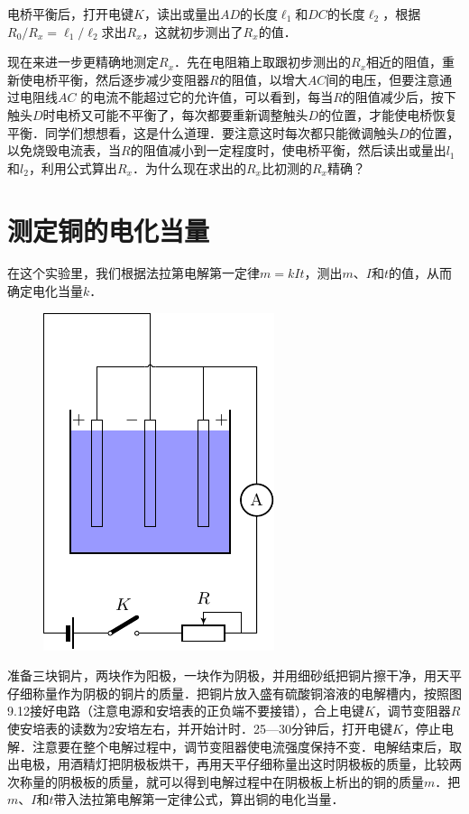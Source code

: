 电桥平衡后，打开电键$K$，读出或量出$AD$的长度$\ell_1$和$DC$的长度$\ell_2$，根据$R_0/R_x=\ell_1/\ell_2$求出$R_x$，这就初步测出了$R_x$的值．

现在来进一步更精确地测定$R_x$．先在电阻箱上取跟初步测出的$R_x$相近的阻值，重新使电桥平衡，然后逐步减少变阻器$R$的阻值，以增大$AC$间的电压，但要注意通过电阻线$AC$
的电流不能超过它的允许值，可以看到，每当$R$的阻值减少后，按下触头$D$时电桥又可能不平衡了，每次都要重新调整触头$D$的位置，才能使电桥恢复平衡．同学们想想看，这是什么道理．要注意这时每次都只能微调触头$D$的位置，以免烧毁电流表，当$R$的阻值减小到一定程度时，使电桥平衡，然后读出或量出$l_1$和$l_2$，利用公式算出$R_x$．为什么现在求出的$R_x$比初测的$R_x$精确？

\section{测定铜的电化当量}
在这个实验里，我们根据法拉第电解第一定律$m=kIt$，测出$m$、$I$和$t$的值，从而确定电化当量$k$．
\begin{figure}[htbp]
    \centering
    \includegraphics{fig/B/9-12.pdf}
    \caption{}\label{fig_B_9-12}
\end{figure}

准备三块铜片，两块作为阳极，一块作为阴极，并用细砂纸把铜片擦干净，用天平仔细称量作为阴极的铜片的质量．把铜片放入盛有硫酸铜溶液的电解槽内，按照图9.12接好电路（注意电源和安培表的正负端不要接错），合上电键$K$，调节变阻器$R$使安培表的读数为2安培左右，并开始计时．25—30分钟后，打开电键$K$，停止电解．注意要在整个电解过程中，调节变阻器使电流强度保持不变．电解结束后，取出电极，用酒精灯把阴极板烘干，再用天平仔细称量出这时阴极板的质量，比较两次称量的阴极板的质量，就可以得到电解过程中在阴极板上析出的铜的质量$m$．把$m$、$I$和$t$带入法拉第电解第一定律公式，算出铜的电化当量．

